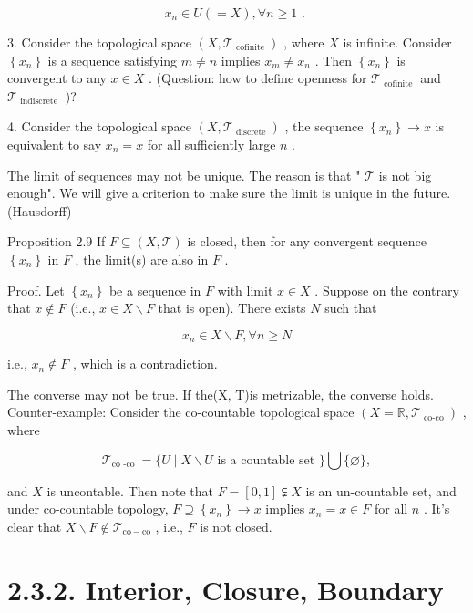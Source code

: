 \[
{x}_{n} \in  U\left( { = X}\right) ,\forall n \geq  1\text{ . }
\]

3. Consider the topological space \(\left( {X,{\mathcal{T}}_{\text{ cofinite }}}\right)\) , where \(X\) is infinite. Consider \(\left\{  {x}_{n}\right\}\) is a sequence satisfying \(m \neq  n\) implies \({x}_{m} \neq  {x}_{n}\) . Then \(\left\{  {x}_{n}\right\}\) is convergent to any \(x \in  X\) . (Question: how to define openness for \({\mathcal{T}}_{\text{ cofinite }}\) and \({\mathcal{T}}_{\text{ indiscrete }}\) )?

4. Consider the topological space \(\left( {X,{\mathcal{T}}_{\text{ discrete }}}\right)\) , the sequence \(\left\{  {x}_{n}\right\}   \rightarrow  x\) is equivalent to say \({x}_{n} = x\) for all sufficiently large \(n\) .

The limit of sequences may not be unique. The reason is that " \(\mathcal{T}\) is not big enough". We will give a criterion to make sure the limit is unique in the future. (Hausdorff)

Proposition 2.9 If \(F \subseteq  \left( {X,\mathcal{T}}\right)\) is closed, then for any convergent sequence \(\left\{  {x}_{n}\right\}\) in \(F\) , the limit(s) are also in \(F\) .

Proof. Let \(\left\{  {x}_{n}\right\}\) be a sequence in \(F\) with limit \(x \in  X\) . Suppose on the contrary that \(x \notin  F\) (i.e., \(x \in  X \smallsetminus  F\) that is open). There exists \(N\) such that

\[
{x}_{n} \in  X \smallsetminus  F,\forall n \geq  N
\]

i.e., \({x}_{n} \notin  F\) , which is a contradiction.

The converse may not be true. If the(X, T)is metrizable, the converse holds. Counter-example: Consider the co-countable topological space \(\left( {X = \mathbb{R},{\mathcal{T}}_{\text{ co-co }}}\right)\) , where

\[
{\mathcal{T}}_{\mathrm{{co}}\text{ -co }} = \{ U \mid  X \smallsetminus  U\text{ is a countable set }\} \bigcup \{ \varnothing \} ,
\]

and \(X\) is uncontable. Then note that \(F = \left\lbrack  {0,1}\right\rbrack   \subsetneqq  X\) is an un-countable set, and under co-countable topology, \(F \supseteq  \left\{  {x}_{n}\right\}   \rightarrow  x\) implies \({x}_{n} = x \in  F\) for all \(n\) . It’s clear that \(X \smallsetminus  F \notin  {\mathcal{T}}_{\mathrm{{co}} - \mathrm{{co}}}\) , i.e., \(F\) is not closed.

\section*{2.3.2. Interior, Closure, Boundary}

